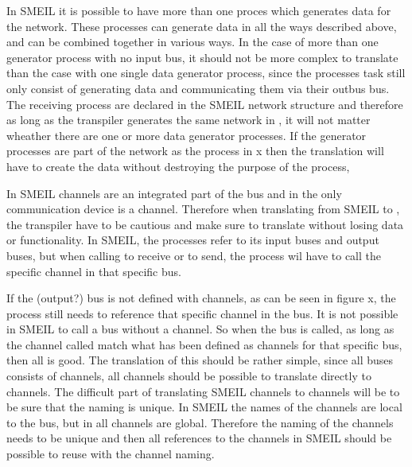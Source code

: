 In SMEIL it is possible to have more than one proces which generates data for the network. These processes can generate data in all the ways described above, and can be combined together in various ways. In the case of more than one generator process with no input bus, it should not be more complex to translate than the case with one single data generator process, since the processes task still only consist of generating data and communicating them via their outbus bus. The receiving process are declared in the SMEIL network structure and therefore as long as the transpiler generates the same network in \cspm, it will not matter wheather there are one or more data generator processes.
If the generator processes are part of the network as the process in x%
then the translation will have to create the data without destroying the purpose of the process, %





In SMEIL channels are an integrated part of the bus and in \cspm the only communication device is a channel. Therefore when translating from SMEIL to \cspm, the transpiler have to be cautious and make sure to translate without losing data or functionality.
In SMEIL, the processes refer to its input buses and output buses, but when calling to receive or to send, the process wil have to call the specific channel in that specific bus.

If the (output?) bus is not defined with channels, as can be seen in figure x,
the process still needs to reference that specific channel in the bus. It is not possible in SMEIL to call a bus without a channel. So when the bus is called, as long as the channel called match what has been defined as channels for that specific bus, then all is good. The translation of this should be rather simple, since all buses consists of channels, all channels should be possible to translate directly to \cspm channels.
The difficult part of translating SMEIL channels to \cspm channels will be to be sure that the naming is unique. In SMEIL the names of the channels are local to the bus, but in \cspm all channels are global. Therefore the naming of the channels needs to be unique and then all references to the channels in SMEIL should be possible to reuse with the \cspm channel naming.






